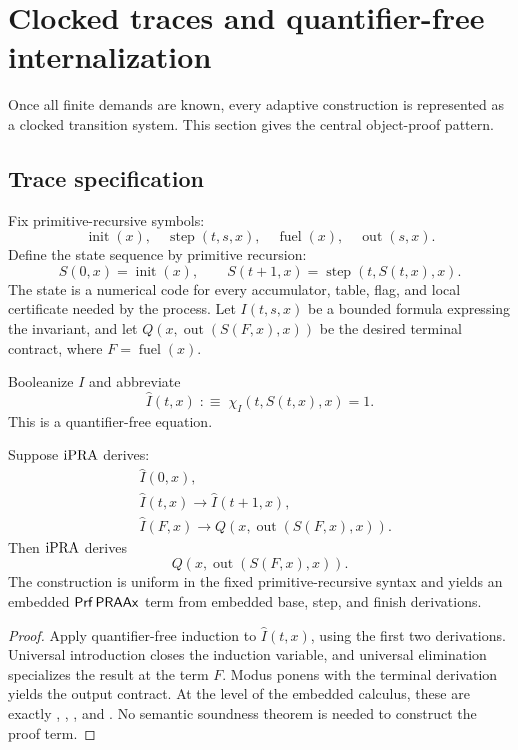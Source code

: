 \section{Clocked traces and quantifier-free internalization}
\label{sec:trace}

Once all finite demands are known, every adaptive construction is represented as a
clocked transition system.  This section gives the central object-proof pattern.

\subsection{Trace specification}

Fix primitive-recursive symbols:
\[
  \operatorname{init}(x),\quad
  \operatorname{step}(t,s,x),\quad
  \operatorname{fuel}(x),\quad
  \operatorname{out}(s,x).
\]
Define the state sequence by primitive recursion:
\[
  S(0,x)=\operatorname{init}(x),\qquad
  S(t+1,x)=\operatorname{step}(t,S(t,x),x).
\]
The state is a numerical code for every accumulator, table, flag, and local certificate
needed by the process.  Let \(I(t,s,x)\) be a bounded formula expressing the invariant,
and let \(Q(x,\operatorname{out}(S(F,x),x))\) be the desired terminal contract, where
\(F=\operatorname{fuel}(x)\).

Booleanize \(I\) and abbreviate
\[
  \widehat I(t,x)\;:\equiv\;\chi_I(t,S(t,x),x)=1.
\]
This is a quantifier-free equation.

\begin{theorem}
\label{thm:trace-internalization}
Suppose \(\mathrm{iPRA}\) derives:
\begin{align*}
 &\widehat I(0,x),\\
 &\widehat I(t,x)\longrightarrow\widehat I(t+1,x),\\
 &\widehat I(F,x)\longrightarrow
   Q(x,\operatorname{out}(S(F,x),x)).
\end{align*}
Then \(\mathrm{iPRA}\) derives
\[
  Q(x,\operatorname{out}(S(F,x),x)).
\]
The construction is uniform in the fixed primitive-recursive syntax and yields an
embedded \(\mathsf{Prf}\,\mathsf{PRAAx}\) term from embedded base, step, and finish derivations.
\end{theorem}

\begin{proof}
Apply quantifier-free induction to \(\widehat I(t,x)\), using the first two derivations.
Universal introduction closes the induction variable, and universal elimination
specializes the result at the term \(F\).  Modus ponens with the terminal derivation
yields the output contract.  At the level of the embedded calculus, these are exactly
, , , and .  No semantic
soundness theorem is needed to construct the proof term.
\end{proof}

